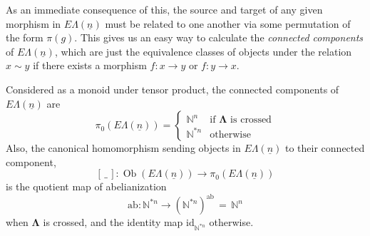 \documentclass{amsbook} %
\newcommand{\id}{\textrm{id}}
\newcommand{\ML}{\mathbf{\Lambda}}
\newcommand{\ELn}{E\Lambda(\underline{n})}
\newcommand{\ob}{\operatorname{Ob}}
\newcommand{\ab}{\mathrm{ab}}
\numberwithin{section}{chapter}
\begin{document}
As an immediate consequence of this, the source and target of any given morphism in $\ELn$ must be related to one another via some permutation of the form $\pi(g)$. This gives us an easy way to calculate the \emph{connected components} of $\ELn$, which are just the equivalence classes of objects under the relation $x \sim y$ if there exists a morphism $f \colon  x \rightarrow y$ or $f \colon y \rightarrow x$.
\begin{prop}\label{Gnconcomp} Considered as a monoid under tensor product, the connected components of $\ELn$ are
  \[
    \pi_0(\ELn) = \begin{cases}
    							 \mathbb{N}^n & \text{if $\ML$ is crossed} \\
    							 \mathbb{N}^{\ast n} & \text{otherwise}
    							\end{cases}
  \] 
Also, the canonical homomorphism sending objects in $\ELn$ to their connected component,
  \[
    [ \, \_ \, ] \colon \ob(\ELn) \rightarrow \pi_0(\ELn)
  \]
is the quotient map of abelianization
  \[
    \ab \colon \mathbb{N}^{*n} \rightarrow (\mathbb{N}^{*n})^{\ab} \, = \, \mathbb{N}^n
  \]
when $\ML$ is crossed, and the identity map $\id_{\mathbb{N}^{*n}}$ otherwise.
\end{prop}
\end{document}
